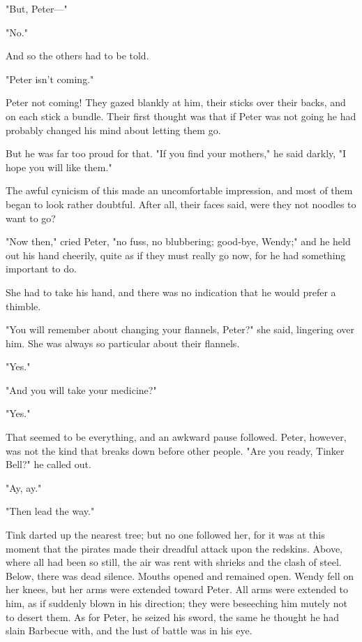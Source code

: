 "But, Peter—"


"No."


And so the others had to be told.


"Peter isn't coming."


Peter not coming! They gazed blankly at him, their sticks over their
backs, and on each stick a bundle. Their first thought was that if Peter
was not going he had probably changed his mind about letting them go.


But he was far too proud for that. "If you find your mothers," he said
darkly, "I hope you will like them."


The awful cynicism of this made an uncomfortable impression, and most of
them began to look rather doubtful. After all, their faces said, were they
not noodles to want to go?


"Now then," cried Peter, "no fuss, no blubbering; good-bye, Wendy;" and he
held out his hand cheerily, quite as if they must really go now, for he
had something important to do.


She had to take his hand, and there was no indication that he would prefer
a thimble.


"You will remember about changing your flannels, Peter?" she said,
lingering over him. She was always so particular about their flannels.


"Yes."


"And you will take your medicine?"


"Yes."


That seemed to be everything, and an awkward pause followed. Peter,
however, was not the kind that breaks down before other people. "Are you
ready, Tinker Bell?" he called out.


"Ay, ay."


"Then lead the way."


Tink darted up the nearest tree; but no one followed her, for it was at
this moment that the pirates made their dreadful attack upon the redskins.
Above, where all had been so still, the air was rent with shrieks and the
clash of steel. Below, there was dead silence. Mouths opened and remained
open. Wendy fell on her knees, but her arms were extended toward Peter.
All arms were extended to him, as if suddenly blown in his direction; they
were beseeching him mutely not to desert them. As for Peter, he seized his
sword, the same he thought he had slain Barbecue with, and the lust of
battle was in his eye.

